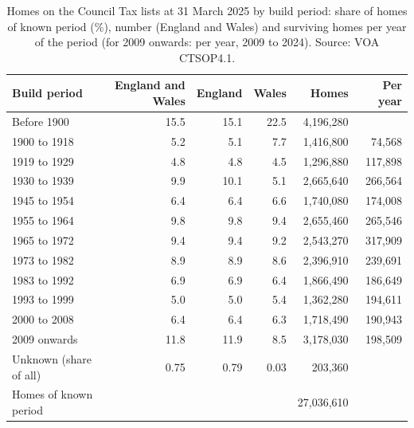 \documentclass[11pt,a4paper]{article}
\begin{document}
\begin{table}[tbp]\centering\small\caption{Homes on the Council Tax lists at 31 March 2025 by build period: share of homes of known period (\%), number (England and Wales) and surviving homes per year of the period (for 2009 onwards: per year, 2009 to 2024). Source: VOA CTSOP4.1.}\label{tab:national}\begin{tabular}{lrrrrr}\toprule Build period & England and Wales & England & Wales & Homes & Per year\\\midrule
Before 1900 & 15.5 & 15.1 & 22.5 & 4,196,280 & \\
1900 to 1918 & 5.2 & 5.1 & 7.7 & 1,416,800 & 74,568\\
1919 to 1929 & 4.8 & 4.8 & 4.5 & 1,296,880 & 117,898\\
1930 to 1939 & 9.9 & 10.1 & 5.1 & 2,665,640 & 266,564\\
1945 to 1954 & 6.4 & 6.4 & 6.6 & 1,740,080 & 174,008\\
1955 to 1964 & 9.8 & 9.8 & 9.4 & 2,655,460 & 265,546\\
1965 to 1972 & 9.4 & 9.4 & 9.2 & 2,543,270 & 317,909\\
1973 to 1982 & 8.9 & 8.9 & 8.6 & 2,396,910 & 239,691\\
1983 to 1992 & 6.9 & 6.9 & 6.4 & 1,866,490 & 186,649\\
1993 to 1999 & 5.0 & 5.0 & 5.4 & 1,362,280 & 194,611\\
2000 to 2008 & 6.4 & 6.4 & 6.3 & 1,718,490 & 190,943\\
2009 onwards & 11.8 & 11.9 & 8.5 & 3,178,030 & 198,509\\
\midrule Unknown (share of all) & 0.75 & 0.79 & 0.03 & 203,360 & \\
Homes of known period & & & & 27,036,610 & \\
\bottomrule\end{tabular}\end{table}
\end{document}
